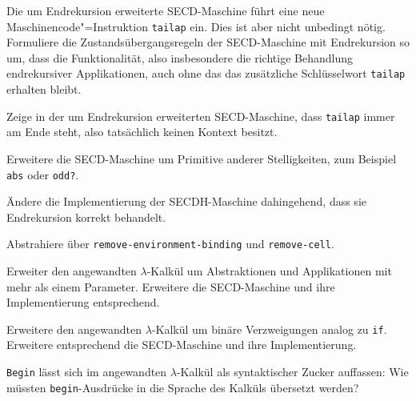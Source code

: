\begin{aufgabe}
  Die um Endrekursion erweiterte SECD-Maschine führt eine neue
  Maschinencode"=Instruktion \lstinline{tailap} ein.  Dies ist aber nicht
  unbedingt nötig.  Formuliere die Zustandsübergangsregeln der
  SECD-Maschine mit Endrekursion so um, dass die Funktionalität, also
  insbesondere die richtige Behandlung endrekursiver Applikationen,
  auch ohne das das zusätzliche Schlüsselwort \lstinline{tailap}
  erhalten bleibt.
\end{aufgabe}

\begin{aufgabe}
  Zeige in der um Endrekursion erweiterten
  SECD-Maschine, dass \lstinline{tailap} immer am Ende steht, also
  tatsächlich keinen Kontext besitzt.
\end{aufgabe}

\begin{aufgabe}\label{aufgabe:prim-arity}
  Erweitere die SECD-Maschine um Primitive anderer Stelligkeiten,
  zum Beispiel \lstinline{abs} oder \lstinline{odd?}.
\end{aufgabe}

\begin{aufgabe}
  Ändere die Implementierung der SECDH-Maschine dahingehend, dass
  sie Endrekursion korrekt behandelt.
\end{aufgabe}

\begin{aufgabe}
  Abstrahiere über \lstinline{remove-environment-binding} und
  \lstinline{remove-cell}.
\end{aufgabe}

\begin{aufgabe}
  Erweiter den angewandten $\lambda$-Kalkül um Abstraktionen und
  Applikationen mit mehr als einem Parameter.  Erweitere die
  SECD-Maschine und ihre Implementierung entsprechend.
\end{aufgabe}


\begin{aufgabe}
  Erweitere den angewandten $\lambda$-Kalkül um binäre
  Verzweigungen analog zu \lstinline{if}.  Erweitere entsprechend die
  SECD-Maschine und ihre Implementierung.
\end{aufgabe}

\begin{aufgabe}
  \lstinline{Begin} lässt sich im angewandten $\lambda$-Kalkül als
  syntaktischer Zucker auffassen: Wie müssten \lstinline{begin}-Ausdrücke
  in die Sprache des Kalküls übersetzt werden?
\end{aufgabe}

